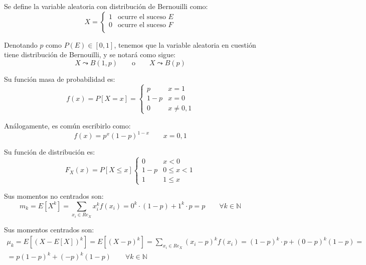 \begin{definicion}
    Se define la variable aleatoria con distribución de Bernouilli como:
    \begin{equation*}
        X = \left\{\begin{array}{cc}
            1 & \text{ocurre el suceso } E \\
            0 & \text{ocurre el suceso } F \\
        \end{array}\right.
    \end{equation*}

    Denotando $p$ como $P(E)\in [0,1]$, tenemos que la variable aleatoria en cuestión tiene distribución de Bernouilli, y se notará como sigue:
        \begin{equation*}
            X \leadsto B(1,p) \qquad \text{o}
            \qquad X \leadsto B(p)
        \end{equation*}
\end{definicion}

Su función masa de probabilidad es:
\begin{equation*}
    f(x) = P[X=x] = \left\{\begin{array}{cc}
        p & x=1 \\
        1-p & x=0 \\
        0 & x\neq 0,1
    \end{array}\right.
\end{equation*}

Análogamente, es común escribirlo como:
$$f(x)=p^x (1-p)^{1-x} \qquad x=0,1$$

Su función de distribución es:
\begin{equation*}
    F_X(x) = P[X\leq x] \left\{\begin{array}{cl}
        0 & x<0 \\
        1-p & 0 \leq x < 1 \\
        1 & 1 \leq x
    \end{array}\right.
\end{equation*}

Sus momentos no centrados son:
\begin{equation*}
    m_k = E[X^k]
    = \sum_{x_i\in Re_X}x_i^kf(x_i)
    = 0^k\cdot (1-p) + 1^k\cdot p = p
    \qquad \forall k\in \mathbb{N}
\end{equation*}

Sus momentos centrados son:
\begin{multline*}
    \mu_k = E[(X-E[X])^k]
    = E[(X-p)^k]
    = \sum_{x_i\in Re_X}(x_i-p)^k   f(x_i)
    = (1-p)^k\cdot p + (0-p)^k(1-p) =\\=
    p(1-p)^k + (-p)^k(1-p)    
    \qquad \forall k\in \mathbb{N}
\end{multline*}

